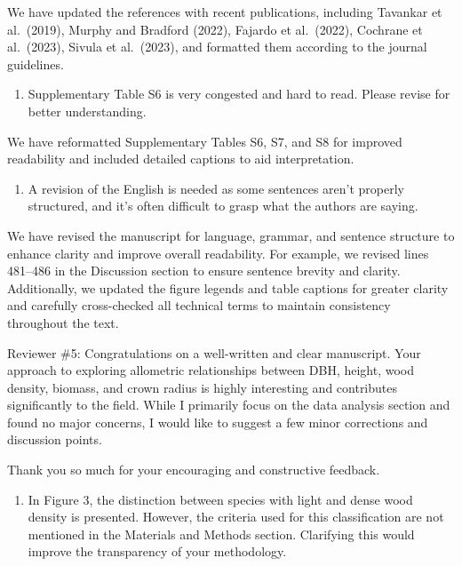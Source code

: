 \documentclass[
  12pt,
  letterpaper,
  DIV=11,
  numbers=noendperiod]{scrartcl}
\providecommand{\tightlist}{%
  \setlength{\itemsep}{0pt}\setlength{\parskip}{0pt}}\usepackage{longtable,booktabs,array}
\renewenvironment{quote}
  {\begin{customblockquote}\color{blockquote-text}\ignorespaces}
  {\end{customblockquote}}
\begin{document}
We have updated the references with recent publications, including
Tavankar et al.~(2019), Murphy and Bradford (2022), Fajardo et
al.~(2022), Cochrane et al.~(2023), Sivula et al.~(2023), and formatted
them according to the journal guidelines.

\begin{quote}
\begin{enumerate}
\def\labelenumi{\arabic{enumi})}
\setcounter{enumi}{7}
\tightlist
\item
  Supplementary Table S6 is very congested and hard to read. Please
  revise for better understanding.
\end{enumerate}
\end{quote}

We have reformatted Supplementary Tables S6, S7, and S8 for improved
readability and included detailed captions to aid interpretation.

\begin{quote}
\begin{enumerate}
\def\labelenumi{\arabic{enumi})}
\setcounter{enumi}{8}
\tightlist
\item
  A revision of the English is needed as some sentences aren't properly
  structured, and it's often difficult to grasp what the authors are
  saying.
\end{enumerate}
\end{quote}

We have revised the manuscript for language, grammar, and sentence
structure to enhance clarity and improve overall readability. For
example, we revised lines 481--486 in the Discussion section to ensure
sentence brevity and clarity. Additionally, we updated the figure
legends and table captions for greater clarity and carefully
cross-checked all technical terms to maintain consistency throughout the
text.

\begin{quote}
Reviewer \#5: Congratulations on a well-written and clear manuscript.
Your approach to exploring allometric relationships between DBH, height,
wood density, biomass, and crown radius is highly interesting and
contributes significantly to the field. While I primarily focus on the
data analysis section and found no major concerns, I would like to
suggest a few minor corrections and discussion points.
\end{quote}

Thank you so much for your encouraging and constructive feedback.

\begin{quote}
\begin{enumerate}
\def\labelenumi{\arabic{enumi})}
\tightlist
\item
  In Figure 3, the distinction between species with light and dense wood
  density is presented. However, the criteria used for this
  classification are not mentioned in the Materials and Methods section.
  Clarifying this would improve the transparency of your methodology.
\end{enumerate}
\end{quote}
\end{document}
